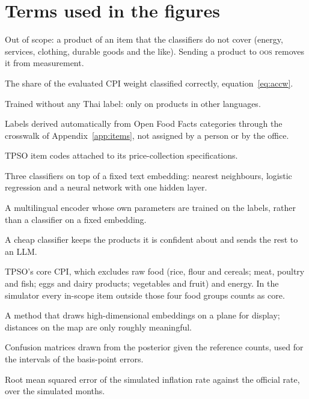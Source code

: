 \section{Terms used in the figures}\label{app:glossary}

\begin{description}[leftmargin=0pt, itemsep=0.2em]
\item[OOS] Out of scope: a product of an item that the classifiers do not cover (energy,
services, clothing, durable goods and the like). Sending a product to \textsc{oos} removes it from
measurement.
\item[Weighted accuracy] The share of the evaluated CPI weight classified correctly,
equation~\eqref{eq:accw}.
\item[Zero-shot] Trained without any Thai label: only on products in other languages.
\item[Weak labels] Labels derived automatically from Open Food Facts categories through the
crosswalk of Appendix~\ref{app:items}, not assigned by a person or by the office.
\item[Official labels] TPSO item codes attached to its price-collection specifications.
\item[kNN, linear, MLP] Three classifiers on top of a fixed text embedding: nearest
neighbours, logistic regression and a neural network with one hidden layer.
\item[Fine-tuned XLM-R] A multilingual encoder whose own parameters are trained on the
labels, rather than a classifier on a fixed embedding.
\item[Cascade] A cheap classifier keeps the products it is confident about and sends the rest
to an LLM.
\item[Core] TPSO's core CPI, which excludes raw food (rice, flour and cereals; meat, poultry
and fish; eggs and dairy products; vegetables and fruit) and energy. In the simulator every
in-scope item outside those four food groups counts as core.
\item[t-SNE] A method that draws high-dimensional embeddings on a plane for display; distances
on the map are only roughly meaningful.
\item[Dirichlet draws] Confusion matrices drawn from the posterior given the reference counts,
used for the intervals of the basis-point errors.
\item[RMSE] Root mean squared error of the simulated inflation rate against the official
rate, over the simulated months.
\end{description}
